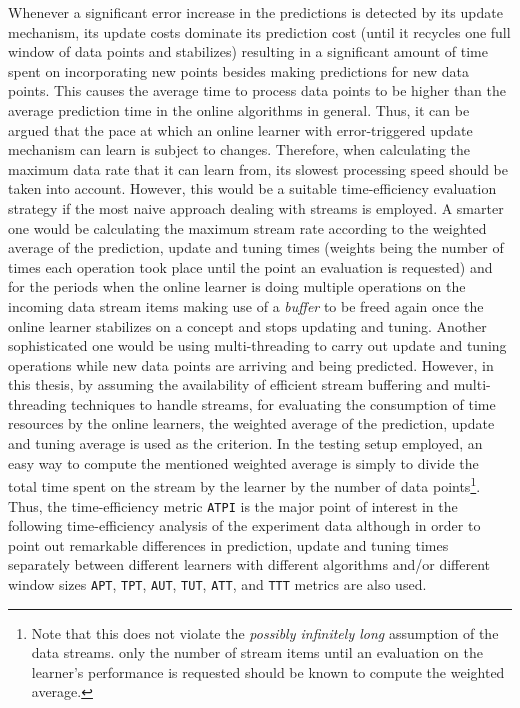 Whenever a significant error increase in the predictions is detected by its update mechanism, its update costs dominate its prediction cost (until it recycles one full window of data points and stabilizes) resulting in a significant amount of time spent on incorporating new points besides making predictions for new data points. This causes the average time to process data points to be higher than the average prediction time in the online algorithms in general. Thus, it can be argued that the pace at which an online learner with error-triggered update mechanism can learn is subject to changes. Therefore, when calculating the maximum data rate that it can learn from, its slowest processing speed should be taken into account. However, this would be a suitable time-efficiency evaluation strategy if the most naive approach dealing with streams is employed. A smarter one would be calculating the maximum stream rate according to the weighted average of the prediction, update and tuning times (weights being the number of times each operation took place until the point an evaluation is requested) and for the periods when the online learner is doing multiple operations on the incoming data stream items making use of a \textit{buffer} to be freed again once the online learner stabilizes on a concept and stops updating and tuning. Another sophisticated one would be using multi-threading to carry out update and tuning operations while new data points are arriving and being predicted. However, in this thesis, by assuming the availability of efficient stream buffering and multi-threading techniques to handle streams, for evaluating the consumption of time resources by the online learners, the weighted average of the prediction, update and tuning average is used as the criterion. In the testing setup employed, an easy way to compute the mentioned weighted average is simply to divide the total time spent on the stream by the learner by the number of data points\footnote{\label{not_violate_assumption}Note that this does not violate the \textit{possibly infinitely long} assumption of the data streams. only the number of stream items until an evaluation on the learner's performance is requested should be known to compute the weighted average.}. Thus, the time-efficiency metric \texttt{ATPI} is the major point of interest in the following time-efficiency analysis of the experiment data although in order to point out remarkable differences in prediction, update and tuning times separately between different learners with different algorithms and/or different window sizes \texttt{APT}, \texttt{TPT}, \texttt{AUT}, \texttt{TUT}, \texttt{ATT}, and \texttt{TTT} metrics are also used.

